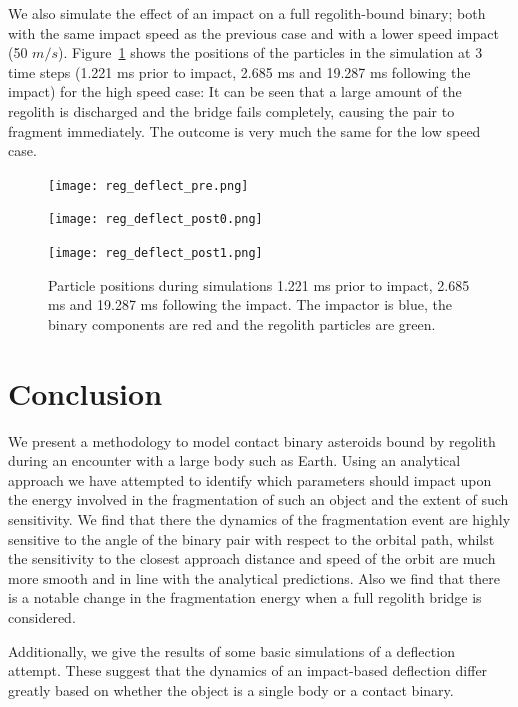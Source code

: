 \documentclass[letterpaper, preprint, paper,11pt]{AAS}	%
\begin{document}
We also simulate the effect of an impact on a full regolith-bound binary; both with the same impact speed as the previous case and with a lower speed impact (50 $m/s$). Figure~\ref{fig:boom} shows the positions of the particles in the simulation at 3 time steps (1.221 ms prior to impact, 2.685 ms  and 19.287 ms following the impact) for the high speed case: It can be seen that a large amount of the regolith is discharged and the bridge fails completely, causing the pair to fragment immediately. The outcome is very much the same for the low speed case. 

\begin{figure}[H]
\centering
\centerline{\texttt{[image: reg\_deflect\_pre.png]}}
\centerline{\texttt{[image: reg\_deflect\_post0.png]}} 
\centerline{\texttt{[image: reg\_deflect\_post1.png]}} 
\caption{Particle positions during simulations 1.221 ms prior to impact, 2.685 ms and 19.287 ms following the impact. The impactor is blue, the binary components are red and the regolith particles are green.} 
\label{fig:boom}
\end{figure} 

\section{Conclusion}
We present a methodology to model contact binary asteroids bound by regolith during an encounter with a large body such as Earth. Using an analytical approach we have attempted to identify which parameters should impact upon the energy involved in the fragmentation of such an object and the extent of such sensitivity. We find that there the dynamics of the fragmentation event are highly sensitive to the angle of the binary pair with respect to the orbital path, whilst the sensitivity to the closest approach distance and speed of the orbit are much more smooth and in line with the analytical predictions. Also we find that there is a notable change in the fragmentation energy when a full regolith bridge is considered.

Additionally, we give the results of some basic simulations of a deflection attempt. These suggest that the dynamics of an impact-based deflection differ greatly based on whether the object is a single body or a contact binary. 


\end{document}
